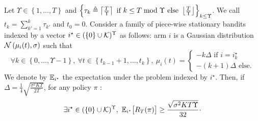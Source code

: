 \begin{lemma}\label{lemma:lb}
Let $\Upsilon \in \left\{1,\dots, T\right\}$ and $\left\{\tau_k \triangleq \left\lceil\frac{T}{ \Upsilon}\right\rceil \text{ if } k \leq T \bmod{\Upsilon} \text{ else } \left\lfloor\frac{T}{ \Upsilon}\right\rfloor\right\}_{k\leq \Upsilon}$. We call $t_k = \sum_{k'=1}^k \tau_{k'}$ and $t_0 = 0$.  Consider a family of piece-wise stationary bandits indexed by a vector $i^\star\in (\{0\}\cup \mathcal{K})^{\Upsilon}$ as follows: arm $i$ is a Gaussian distribution $\mathcal{N}\left(\mu_i(t), \sigma\right)$ such that 
\[
\forall k \in \left\{0 , \dots, \Upsilon -1 \right\}, \ \forall t \in \left\{t_{k-1}+1,\dots, t_{k}\right\}, \ 
\mu_i(t) = 
\begin{cases}
-k \Delta \text{ if } i = i^\star_k\\
-(k+1)\Delta  \text{ else.}
\end{cases}
\]
We denote by $\mathbb{E}_{i^\star}$ the expectation under the problem indexed by $i^\star$. Then, if $\Delta = \frac{1}{4}\sqrt{\frac{\sigma^2K\Upsilon}{2T}}$, for any policy $\pi$ :
\[
 \exists i^\star\in (\{0\}\cup \mathcal{K})^{\Upsilon}, \  \mathbb{E}_{i^\star}\big[R_T(\pi)\big]  \geq  \frac{\sqrt{\sigma^2KT\Upsilon}}{32}\cdot
\]
\end{lemma}

